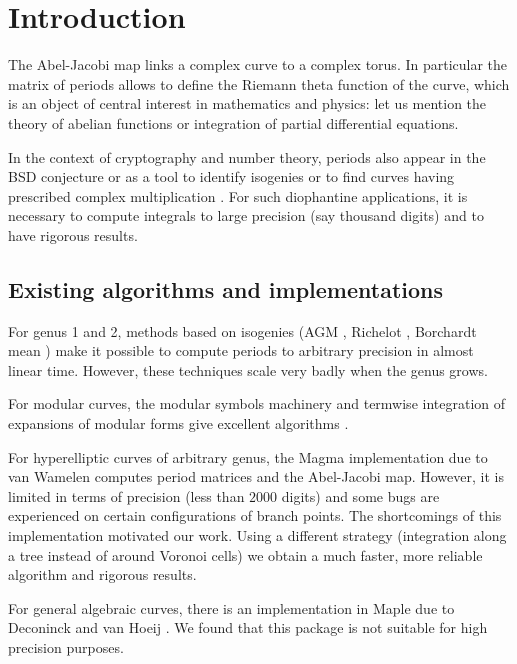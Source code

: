 \documentclass[main.tex]{subfiles}
\begin{document}
  \section{Introduction}

  The Abel-Jacobi map links a complex curve to a complex torus.
  In particular the matrix of periods allows to define the Riemann
  theta function of the curve, which is an object of central interest in
  mathematics and physics: let us
  mention the theory of abelian functions or integration of partial differential
  equations.

  In the context of cryptography and number theory, periods also appear
  in the BSD conjecture or as a tool to identify isogenies or to find
  curves having prescribed complex multiplication \cite{vanWamelen06}.
  For such diophantine applications, it is necessary to compute
  integrals to large precision (say thousand digits) and to have
  rigorous results.

  \subsection{Existing algorithms and implementations}

  For genus 1 and 2, methods based on isogenies (AGM \cite{CremonaAGM13},
  Richelot \cite{BostMestre88}, Borchardt mean \cite{Labrande16})
  make it possible to compute periods to arbitrary precision in almost
  linear time. However, these techniques scale very badly when the genus grows.

  For modular curves, the modular symbols machinery and termwise integration of
  expansions of modular forms give excellent algorithms
  \cite[\S 3.2]{Mascot13}.

  For hyperelliptic curves of arbitrary genus, the Magma implementation
  due to van Wamelen \cite{vanWamelen06} computes period matrices and the Abel-Jacobi map.
  However, it is limited in terms of precision (less
  than $2000$ digits) and some bugs are experienced on
  certain configurations of branch points. The shortcomings of this implementation motivated our
  work. Using a different strategy
  (integration along a tree instead of around Voronoi cells)
  we obtain a much faster, more reliable algorithm and rigorous results.

  For general algebraic curves, there is an implementation in Maple
  due to Deconinck and van Hoeij \cite{DeconinckvanHoeij01}.
  We found that this package is not suitable for high precision purposes.
\end{document}

